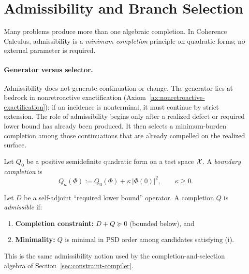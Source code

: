 \section{Admissibility and Branch Selection}
\label{sec:admissibility}

Many problems produce more than one algebraic completion.
In Coherence Calculus, admissibility is a \emph{minimum completion} principle
on quadratic forms; no external parameter is required.

\paragraph{Generator versus selector.}
Admissibility does not generate continuation or change. The generator lies at
bedrock in nonretroactive exactification
(Axiom~\ref{ax:nonretroactive-exactification}): if an incidence is nonterminal,
it must continue by strict extension. The role of admissibility begins only
after a realized defect or required lower bound has already been produced. It
then selects a minimum-burden completion among those continuations that are
already compelled on the realized surface.

\begin{definition}
\label{def:boundary-completion}
Let $Q_0$ be a positive semidefinite quadratic form on a test space $\mathcal{X}$.
A \emph{boundary completion} is
\[
Q_\kappa(\Phi) := Q_0(\Phi) + \kappa\,|\Phi(0)|^2,\qquad \kappa\ge 0.
\]
\end{definition}

\begin{definition}
\label{def:admissibility-formal}
Let $D$ be a self-adjoint ``required lower bound'' operator.
A completion $Q$ is \emph{admissible} if:
\begin{enumerate}[label=(\roman*)]
\item \textbf{Completion constraint:} $D + Q \succeq 0$ (bounded below), and
\item \textbf{Minimality:} $Q$ is minimal in PSD order among candidates satisfying (i).
\end{enumerate}
This is the same admissibility notion used by the completion-and-selection
algebra of Section~\ref{sec:constraint-compiler}.
\end{definition}

